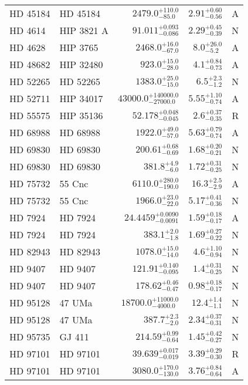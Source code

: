 \begin{longtable*}{llrrr}
HD 45184 & HD 45184 & $2479.0^{+110.0}_{-85.0}$ & $2.91^{+0.60}_{-0.56}$ & A \\
HD 4614 & HIP 3821 A & $91.011^{+0.093}_{-0.086}$ & $2.29^{+0.45}_{-0.39}$ & N \\
HD 4628 & HIP 3765 & $2468.0^{+16.0}_{-67.0}$ & $8.0^{+26.0}_{-5.2}$ & A \\
HD 48682 & HIP 32480 & $923.0^{+15.0}_{-28.0}$ & $4.1^{+0.84}_{-0.73}$ & A \\
HD 52265 & HD 52265 & $1383.0^{+25.0}_{-15.0}$ & $6.5^{+2.3}_{-1.2}$ & N \\
HD 52711 & HIP 34017 & $43000.0^{+140000.0}_{-27000.0}$ & $5.55^{+1.10}_{-0.74}$ & A \\
HD 55575 & HIP 35136 & $52.178^{+0.048}_{-0.045}$ & $2.6^{+0.37}_{-0.35}$ & R \\
HD 68988 & HD 68988 & $1922.0^{+49.0}_{-57.0}$ & $5.63^{+0.79}_{-0.74}$ & A \\
HD 69830 & HD 69830 & $200.61^{+0.68}_{-0.69}$ & $1.68^{+0.20}_{-0.21}$ & N \\
HD 69830 & HD 69830 & $381.8^{+4.9}_{-6.0}$ & $1.72^{+0.31}_{-0.25}$ & N \\
HD 75732 & 55 Cnc & $6110.0^{+280.0}_{-190.0}$ & $16.3^{+2.5}_{-2.9}$ & A \\
HD 75732 & 55 Cnc & $1966.0^{+23.0}_{-22.0}$ & $5.17^{+0.41}_{-0.36}$ & N \\
HD 7924 & HD 7924 & $24.4459^{+0.0090}_{-0.0091}$ & $1.59^{+0.18}_{-0.17}$ & A \\
HD 7924 & HD 7924 & $383.1^{+2.0}_{-1.8}$ & $1.69^{+0.27}_{-0.22}$ & N \\
HD 82943 & HD 82943 & $1078.0^{+15.0}_{-14.0}$ & $4.6^{+1.10}_{-0.94}$ & N \\
HD 9407 & HD 9407 & $121.91^{+0.140}_{-0.095}$ & $1.4^{+0.31}_{-0.25}$ & N \\
HD 9407 & HD 9407 & $178.62^{+0.46}_{-0.47}$ & $0.98^{+0.18}_{-0.17}$ & N \\
HD 95128 & 47 UMa & $18700.0^{+11000.0}_{-4000.0}$ & $12.4^{+1.4}_{-1.1}$ & N \\
HD 95128 & 47 UMa & $387.7^{+2.3}_{-2.0}$ & $2.34^{+0.37}_{-0.31}$ & N \\
HD 95735 & GJ 411 & $214.59^{+0.99}_{-0.64}$ & $1.45^{+0.42}_{-0.27}$ & N \\
HD 97101 & HD 97101 & $39.639^{+0.017}_{-0.019}$ & $3.39^{+0.29}_{-0.30}$ & R \\
HD 97101 & HD 97101 & $3080.0^{+170.0}_{-130.0}$ & $3.76^{+0.84}_{-0.64}$ & A \\

\end{longtable*}

